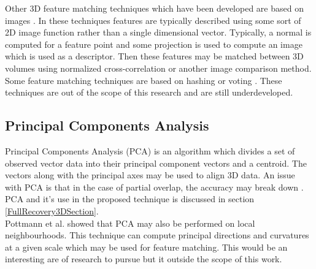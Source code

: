Other 3D feature matching techniques which have been developed are based on images \cite{Wolfson97Geometric,Johnson97Spin}. In these techniques features are typically described using some sort of 2D image function rather than a single dimensional vector. Typically, a normal is computed for a feature point and some projection is used to compute an image which is used as a descriptor. Then these features may be matched between 3D volumes using normalized cross-correlation or another image comparison method.  \\

Some feature matching techniques are based on hashing or voting \cite{Germain97Fingerprint,Gal06Salient,Mitra04Registration,Ballard91Generalizing}. These techniques are out of the scope of this research and are still underdeveloped. \\


\subsection{Principal Components Analysis}

Principal Components Analysis (PCA) is an algorithm which divides a set of observed vector data into their principal component vectors and a centroid. The vectors along with the principal axes may be used to align 3D data. An issue with PCA is that in the case of partial overlap, the accuracy may break down \cite{Aiger084}. PCA and it's use in the proposed technique is discussed in section \ref{FullRecovery3DSection}. \\

Pottmann et al. \cite{Pottmann07Principal} showed that PCA may also be performed on local neighbourhoods. This technique can compute principal directions and curvatures at a given scale which may be used for feature matching. This would be an interesting are of research to pursue but it outside the scope of this work. \\

